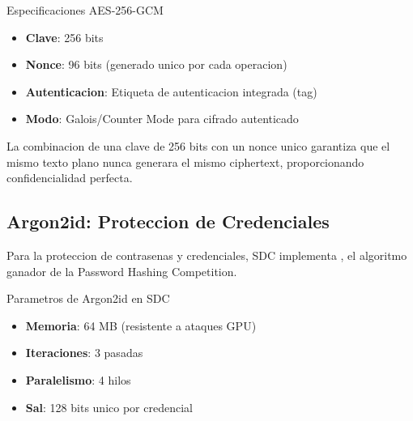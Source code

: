 
\begin{caja}{Especificaciones AES-256-GCM}
\begin{itemize}
\item \textbf{Clave}: 256 bits
\item \textbf{Nonce}: 96 bits (generado unico por cada operacion)
\item \textbf{Autenticacion}: Etiqueta de autenticacion integrada (tag)
\item \textbf{Modo}: Galois/Counter Mode para cifrado autenticado
\end{itemize}
\end{caja}

La combinacion de una clave de 256 bits con un nonce unico garantiza que el mismo texto plano nunca generara el mismo ciphertext, proporcionando confidencialidad perfecta.

\subsection{Argon2id: Proteccion de Credenciales}

Para la proteccion de contrasenas y credenciales, SDC implementa , el algoritmo ganador de la Password Hashing Competition.


\begin{caja}{Parametros de Argon2id en SDC}
\begin{itemize}
\item \textbf{Memoria}: 64 MB (resistente a ataques GPU)
\item \textbf{Iteraciones}: 3 pasadas
\item \textbf{Paralelismo}: 4 hilos
\item \textbf{Sal}: 128 bits unico por credencial
\end{itemize}
\end{caja}


